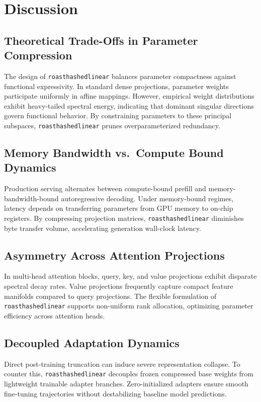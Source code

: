 \section{Discussion}

\subsection{Theoretical Trade-Offs in Parameter Compression}
The design of \texttt{roasthashedlinear} balances parameter compactness against functional expressivity. In standard dense projections, parameter weights participate uniformly in affine mappings. However, empirical weight distributions exhibit heavy-tailed spectral energy, indicating that dominant singular directions govern functional behavior. By constraining parameters to these principal subspaces, \texttt{roasthashedlinear} prunes overparameterized redundancy.

\subsection{Memory Bandwidth vs.\ Compute Bound Dynamics}
Production serving alternates between compute-bound prefill and memory-bandwidth-bound autoregressive decoding. Under memory-bound regimes, latency depends on transferring parameters from GPU memory to on-chip registers. By compressing projection matrices, \texttt{roasthashedlinear} diminishes byte transfer volume, accelerating generation wall-clock latency.

\subsection{Asymmetry Across Attention Projections}
In multi-head attention blocks, query, key, and value projections exhibit disparate spectral decay rates. Value projections frequently capture compact feature manifolds compared to query projections. The flexible formulation of \texttt{roasthashedlinear} supports non-uniform rank allocation, optimizing parameter efficiency across attention heads.

\subsection{Decoupled Adaptation Dynamics}
Direct post-training truncation can induce severe representation collapse. To counter this, \texttt{roasthashedlinear} decouples frozen compressed base weights from lightweight trainable adapter branches. Zero-initialized adapters ensure smooth fine-tuning trajectories without destabilizing baseline model predictions.

